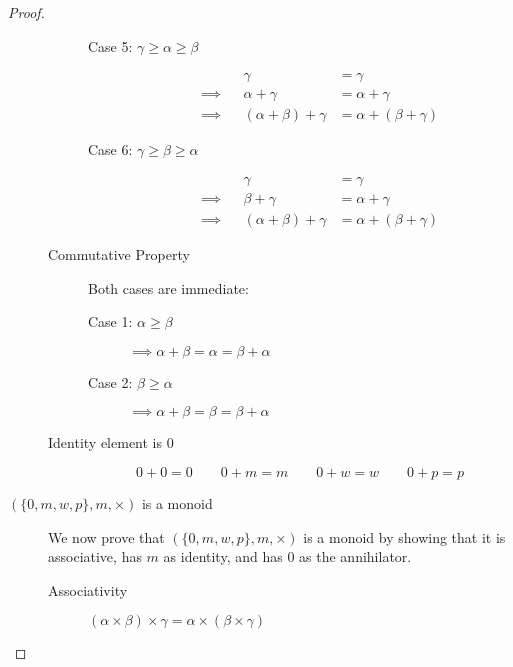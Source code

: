 \documentclass[runningheads]{llncs}
\begin{document}
\begin{proof}
\begin{description}
\begin{description}
\begin{description}
						\item[Case 5: \(\gamma \geqslant \alpha \geqslant \beta\)]
							\begin{align*}
								         &  & \gamma                     & = \gamma                    \\
								\implies &  & \alpha + \gamma            & = \alpha + \gamma           \\
								\implies &  & (\alpha + \beta ) + \gamma & = \alpha + (\beta + \gamma)
							\end{align*}

						\item[Case 6: \(\gamma \geqslant \beta \geqslant \alpha\)]
							\begin{align*}
								         &  & \gamma                     & = \gamma                    \\
								\implies &  & \beta + \gamma             & = \alpha + \gamma           \\
								\implies &  & (\alpha + \beta ) + \gamma & = \alpha + (\beta + \gamma)
							\end{align*}
					\end{description}

				\item[Commutative Property]
					Both cases are immediate:
					\begin{description}
						\item[Case 1: \(\alpha \geqslant \beta\)] \(\implies \alpha + \beta = \alpha = \beta + \alpha\)
						\item[Case 2: \(\beta \geqslant \alpha\)] \(\implies \alpha + \beta = \beta = \beta + \alpha\)
					\end{description}

				\item[Identity element is \(0\)]
					\[0 + 0 = 0 \qquad 0 + m = m \qquad 0 + w = w \qquad 0 + p = p\]
			\end{description}

		\item[\((\{0,m,w,p\}, m, \times )\) is a monoid]
			We now prove that \((\{0,m,w,p\}, m, \times )\) is a monoid by showing that it is associative, has \(m\) as identity, and has \(0\) as the annihilator.

			\begin{description}
				\item [Associativity]

				      \((\alpha \times \beta ) \times \gamma = \alpha \times (\beta \times \gamma )\)


\end{description}
\end{description}
\end{proof}
\end{document}
